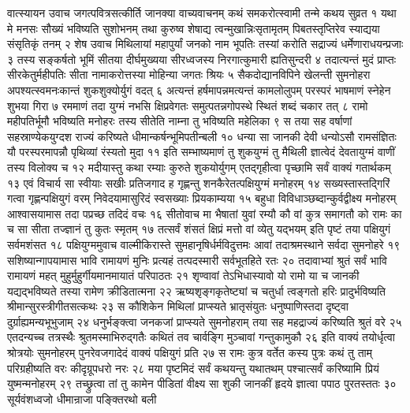 वात्स्यायन उवाच
जगत्पवित्रसत्कीर्ति जानक्या वाच्यवाचनम्
कथं समकरोत्स्वामी तन्मे कथय सुव्रत १
यथा मे मनसः सौख्यं भविष्यति सुशोभनम्
तथा कुरुष्व शेषाद्य त्वन्मुखान्निःसृतामृतम्
पिबतस्तृप्तिरेव स्याद्यया संसृतिकृं तनम् २
शेष उवाच
मिथिलायां महापुर्यां जनको नाम भूपतिः
तस्यां करोति सद्राज्यं धर्मेणाराधयन्प्रजाः ३
तस्य सङ्कर्षतो भूमिं सीतया दीर्घमुख्यया
सीरध्वजस्य निरगात्कुमारी ह्यतिसुन्दरी ४
तदात्यन्तं मुदं प्राप्तः सीरकेतुर्महीपतिः
सीता नामाकरोत्तस्या मोहिन्या जगतः श्रियः ५
सैकदोद्यानविपिने खेलन्ती सुमनोहरा
अपश्यत्स्वमनःकान्तं शुकशुक्योर्युगं वदत् ६
अत्यन्तं हर्षमापन्नमत्यन्तं कामलोलुपम्
परस्परं भाषमाणं स्नेहेन शुभया गिरा ७
रममाणं तदा युग्मं नभसि क्षिप्रवेगतः
समुत्पतन्नगोपस्थे स्थितं शब्दं चकार तत् ८
रामो महीपतिर्भूमौ भविष्यति मनोहरः
तस्य सीतेति नाम्ना तु भविष्यति महेलिका ९
स तया सह वर्षाणां सहस्राण्येकयुग्दश
राज्यं करिष्यते धीमान्कर्षन्भूमिपतीन्बली १०
धन्या सा जानकी देवी धन्योऽसौ रामसंज्ञितः
यौ परस्परमापन्नौ पृथिव्यां रंस्यतो मुदा ११
इति सम्भाष्यमाणं तु शुकयुग्मं तु मैथिली
ज्ञात्वेदं देवतायुग्मं वाणीं तस्य विलोक्य च १२
मदीयास्तु कथा रम्याः कुरुते शुकयोर्युगम्
एतद्गृहीत्वा पृच्छामि सर्वं वाक्यं गतार्थकम् १३
एवं विचार्य सा स्वीयाः सखीः प्रतिजगाद ह
गृह्णन्तु शनकैरेतत्पक्षियुग्मं मनोहरम् १४
सख्यस्तास्तद्गिरिं गत्वा गृह्णन्पक्षियुगं वरम्
निवेदयामासुरिदं स्वसख्याः प्रियकाम्यया १५
बहुधा विविधाञ्छब्दान्कुर्वद्वीक्ष्य मनोहरम्
आश्वासयामास तदा पप्रच्छ तदिदं वचः १६
सीतोवाच
मा भैषातां युवां रम्यौ कौ वां कुत्र समागतौ
को रामः का च सा सीता तज्ज्ञानं तु कुतः स्मृतम् १७
तत्सर्वं शंसतं क्षिप्रं मत्तो वां व्येतु यद्भयम्
इति पृष्टं तया पक्षियुगं सर्वमशंसत १८
पक्षियुग्ममुवाच
वाल्मीकिरास्ते सुमहानृषिर्धर्मविदुत्तमः
आवां तदाश्रमस्थाने सर्वदा सुमनोहरे १९
सशिष्यान्गापयामास भावि रामायणं मुनिः
प्रत्यहं तत्पदस्मारी सर्वभूतहिते रतः २०
तदावाभ्यां श्रुतं सर्वं भावि रामायणं महत्
मुहुर्मुहुर्गीयमानमायातं परिपाठतः २१
शृण्वावां तेऽभिधास्यावो यो रामो या च जानकी
यद्यद्भविष्यते तस्या रामेण क्रीडितात्मना २२
ऋष्यशृङ्गकृतेष्ट्यां च चतुर्धा त्वङ्गतो हरिः
प्रादुर्भविष्यति श्रीमान्सुरस्त्रीगीतसत्कथः २३
स कौशिकेन मिथिलां प्राप्स्यते भ्रातृसंयुतः
धनुष्पाणिस्तदा दृष्ट्वा दुर्ग्राह्यमन्यभूभुजाम् २४
धनुर्भङ्क्त्वा जनकजां प्राप्स्यते सुमनोहराम्
तया सह महद्राज्यं करिष्यति श्रुतं वरे २५
एतदन्यच्च तत्रस्थैः श्रुतमस्माभिरुद्गतैः
कथितं तव चार्वङ्गि मुञ्चावां गन्तुकामुकौ २६
इति वाक्यं तयोर्धृत्वा श्रोत्रयोः सुमनोहरम्
पुनरेवजगादेदं वाक्यं पक्षियुगं प्रति २७
स रामः कुत्र वर्तेत कस्य पुत्रः कथं तु ताम्
परिग्रहीष्यति वरः कीदृग्रूपधरो नरः २८
मया पृष्टमिदं सर्वं कथयन्तु यथातथम्
पश्चात्सर्वं करिष्यामि प्रियं युष्मन्मनोहरम् २९
तच्छ्रुत्वा तां तु कामेन पीडितां वीक्ष्य सा शुकी
जानकीं हृदये ज्ञात्वा पपाठ पुरतस्ततः ३०
सूर्यवंशध्वजो धीमान्राजा पङ्क्तिरथो बली

